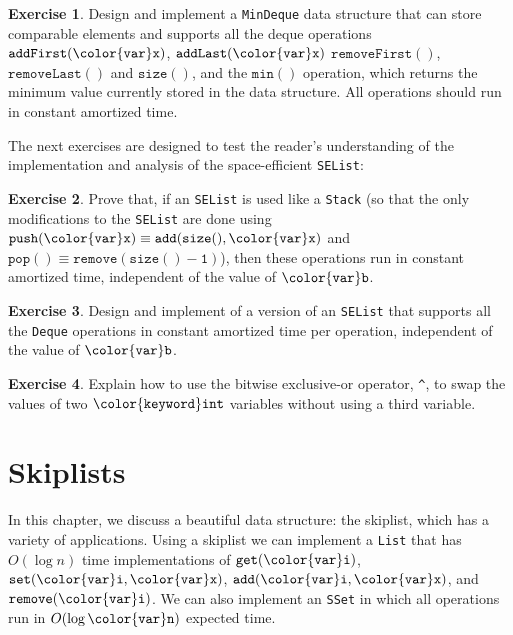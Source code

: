 \documentclass[10pt]{book}
\newcommand{\chaplabel}[1]{\label{chap:#1}}
\theoremstyle{plain}
\theoremstyle{definition}
\newtheorem{exc}{Exercise}[chapter]
\begin{document}
\begin{exc}
  Design and implement a \texttt{MinDeque} data structure that can store
  comparable elements and supports all the deque operations \ensuremath{\mathtt{addFirst({\color{var}x})}},
  \ensuremath{\mathtt{addLast({\color{var}x})}} \ensuremath{\mathtt{removeFirst()}}, \ensuremath{\mathtt{removeLast()}} and \ensuremath{\mathtt{size()}}, and the
  \ensuremath{\mathtt{min()}} operation, which returns the minimum value currently stored in
  the data structure.  All operations should run in constant amortized
  time.
\end{exc}

The next exercises are designed to test the reader's understanding of
the implementation and analysis of the space-efficient \texttt{SEList}:

\begin{exc}
  Prove that, if an \texttt{SEList} is used like a \texttt{Stack} (so that the
  only modifications to the \texttt{SEList} are done using $\ensuremath{\mathtt{push({\color{var}x})}}\equiv
  \ensuremath{\mathtt{add(size(),{\color{var}x})}}$ and $\ensuremath{\mathtt{pop()}}\equiv \ensuremath{\mathtt{remove(size()-1)}}$), then these
  operations run in constant amortized time, independent of the value
  of \ensuremath{\mathtt{{\color{var}b}}}.
\end{exc}

\begin{exc}
  Design and implement of a version of an \texttt{SEList} that supports all
  the \texttt{Deque} operations in constant amortized time per operation,
  independent of the value of \ensuremath{\mathtt{{\color{var}b}}}.
\end{exc}

\begin{exc}
  Explain how to use the bitwise exclusive-or operator, \verb+^+, to
  swap the values of two \ensuremath{\mathtt{{\color{keyword}int}}} variables without using a third variable.
\end{exc}






\clearpage

\clearpage
\chapter{Skiplists}

\chaplabel{skiplists}

In this chapter, we discuss a beautiful data structure: the skiplist,
which has a variety of applications.  Using a skiplist we can implement a
\texttt{List} that has $O(\log n)$ time implementations of \ensuremath{\mathtt{get({\color{var}i})}}, \ensuremath{\mathtt{set({\color{var}i},{\color{var}x})}},
\ensuremath{\mathtt{add({\color{var}i},{\color{var}x})}}, and \ensuremath{\mathtt{remove({\color{var}i})}}. We can also implement an \texttt{SSet} in which
all operations run in $O(\log \ensuremath{\mathtt{{\color{var}n}}})$ expected time.
\end{document}
